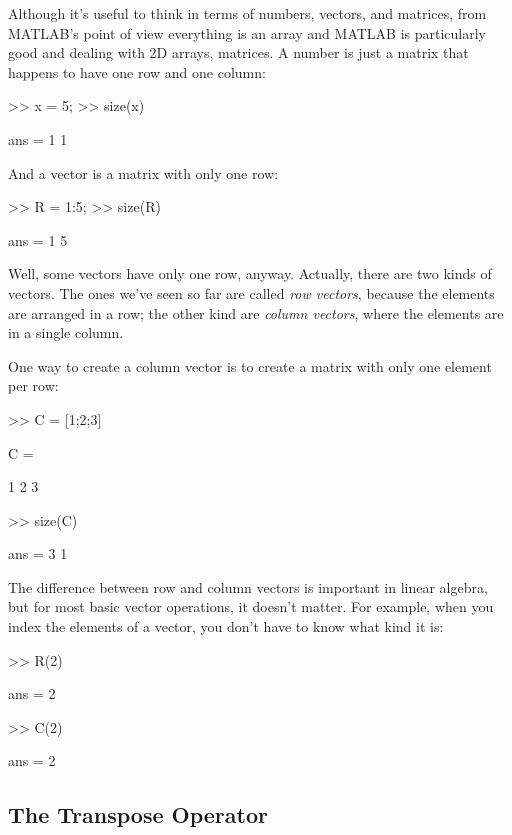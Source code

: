 
Although it's useful to think in terms of numbers, vectors, and matrices,
from MATLAB's point of view everything is an array and MATLAB is particularly good and dealing with 2D arrays, matrices.  A number
is just a matrix that happens to have one row and one column:

\begin{code}
>> x = 5;
>> size(x)

ans = 1     1
\end{code}

And a vector is a matrix with only one row:

\begin{code}
>> R = 1:5;
>> size(R)

ans = 1     5
\end{code}

Well, some vectors have only one row, anyway.  Actually, there are two kinds
of vectors.  The ones we've seen so far are called \emph{row vectors},
because the elements are arranged in a row; the other kind are
\emph{column vectors}, where the elements are in a single column.

One way to create a column vector is to create a matrix with only
one element per row:

\begin{code}
>> C = [1;2;3]

C =

     1
     2
     3

>> size(C)

ans = 3     1
\end{code}

The difference between row and column vectors is important in
linear algebra, but for most basic vector operations, it doesn't matter.
For example, when you index the elements of a vector, you don't have to know what kind
it is:


\begin{code}
>> R(2)

ans = 2

>> C(2)

ans = 2
\end{code}


\subsection{The Transpose Operator}

